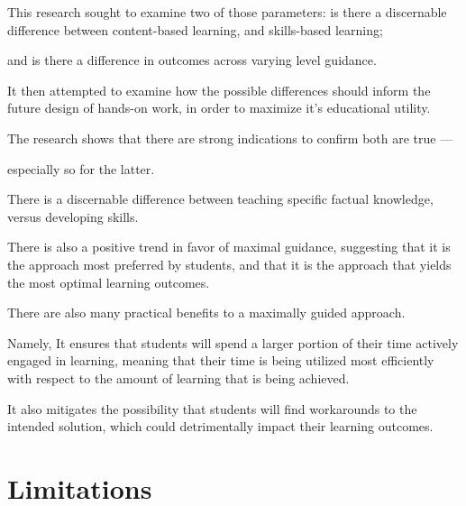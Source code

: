 This research sought to examine two of those parameters: is there a discernable difference between content-based learning, and skills-based learning; %



and is there a difference in outcomes across varying level guidance. %



It then attempted to examine how the possible differences should inform the future design of hands-on work, in order to maximize it's educational utility. %



The research shows that there are strong indications to confirm both are true ---%



 especially so for the latter. %



There is a discernable difference between teaching specific factual knowledge, versus developing skills. %



There is also a positive trend in favor of maximal guidance, suggesting that it is the approach most preferred by students, and that it is the approach that yields the most optimal learning outcomes. 







There are also many practical benefits to a maximally guided approach. %



Namely, It ensures that students will spend a larger portion of their time actively engaged in learning, meaning that their time is being utilized most efficiently with respect to the amount of learning that is being achieved. %



It also mitigates the possibility that students will find workarounds to the intended solution, which could detrimentally impact their learning outcomes. 











\section{Limitations}



